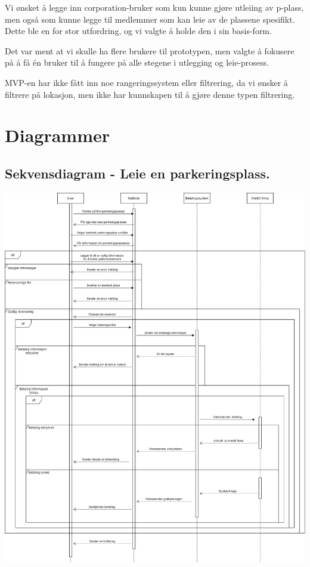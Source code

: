 \documentclass[12pt]{article}
\begin{document}
    Vi ønsket å legge inn corporation-bruker som kun kunne gjøre utleiing av p-plass, men også som kunne legge til medlemmer som kan leie av de plassene spesifikt. Dette ble en for stor utfordring, og vi valgte å holde den i sin basis-form.
    
    Det var ment at vi skulle ha flere brukere til prototypen, men valgte å fokusere på å få én bruker til å fungere på alle stegene i utlegging og leie-prosess.
    
    MVP-en har ikke fått inn noe rangeringssystem eller filtrering, da vi ønsker å filtrere på lokasjon, men ikke har kunnskapen til å gjøre denne typen filtrering.

\section{Diagrammer}
    \subsection{Sekvensdiagram - Leie en parkeringsplass.}
    \includegraphics[max width=\textwidth]{bilder/diagrammer/sekvens_leietaker.png}
\end{document}
